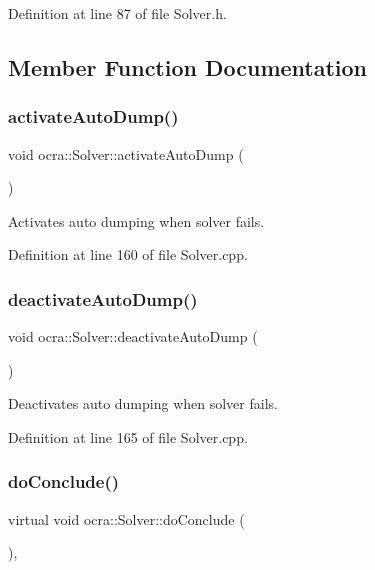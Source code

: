 Definition at line 87 of file Solver.\+h.



\subsection{Member Function Documentation}
\hypertarget{classocra_1_1Solver_abe008748e898aff38d0c13c4c9edbe5a}{}\label{classocra_1_1Solver_abe008748e898aff38d0c13c4c9edbe5a} 
\subsubsection{\texorpdfstring{activate\+Auto\+Dump()}{activateAutoDump()}}
{\footnotesize\ttfamily void ocra\+::\+Solver\+::activate\+Auto\+Dump (\begin{DoxyParamCaption}{ }\end{DoxyParamCaption})}

Activates auto dumping when solver fails. 

Definition at line 160 of file Solver.\+cpp.

\hypertarget{classocra_1_1Solver_a4b766c5ed75ce93245fecb64ae115adb}{}\label{classocra_1_1Solver_a4b766c5ed75ce93245fecb64ae115adb} 
\subsubsection{\texorpdfstring{deactivate\+Auto\+Dump()}{deactivateAutoDump()}}
{\footnotesize\ttfamily void ocra\+::\+Solver\+::deactivate\+Auto\+Dump (\begin{DoxyParamCaption}{ }\end{DoxyParamCaption})}

Deactivates auto dumping when solver fails. 

Definition at line 165 of file Solver.\+cpp.

\hypertarget{classocra_1_1Solver_ac9d2d41d544b57a75e0d03db073d646e}{}\label{classocra_1_1Solver_ac9d2d41d544b57a75e0d03db073d646e} 
\subsubsection{\texorpdfstring{do\+Conclude()}{doConclude()}}
{\footnotesize\ttfamily virtual void ocra\+::\+Solver\+::do\+Conclude (\begin{DoxyParamCaption}{ }\end{DoxyParamCaption})\hspace{0.3cm}{\ttfamily [protected]}, {}}



